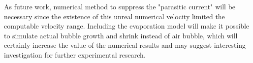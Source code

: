 \documentclass[a4,14pt]{extarticle}
\begin{document}
As future work, numerical method to suppress the "parasitic current" will be necessary
since the existence of this unreal numerical velocity limited the computable velocity
range. Including the evaporation model will make it possible to simulate actual bubble
growth and shrink instead of air bubble, which will certainly increase the value of
the numerical results and may suggest interesting investigation for further experimental
research.




%
%

\clearpage
\printbibliography[title=References]

\clearpage
\printnomenclature
\end{document}

